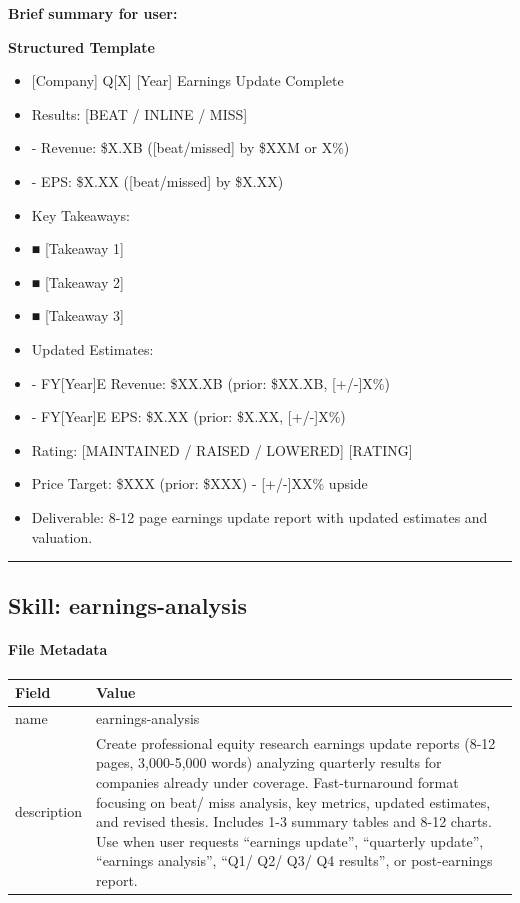 \documentclass[11pt]{article}
\begin{document}
\textbf{Brief summary for user:}

\textbf{Structured Template}
\begin{itemize}[leftmargin=*,itemsep=2pt,topsep=2pt]
\item {} [Company] Q[X] [Year] Earnings Update Complete
\item {} Results: [BEAT / INLINE / MISS]
\item {} - Revenue: \$X.XB ([beat/missed] by \$XXM or X\%)
\item {} - EPS: \$X.XX ([beat/missed] by \$X.XX)
\item {} Key Takeaways:
\item {} ■ [Takeaway 1]
\item {} ■ [Takeaway 2]
\item {} ■ [Takeaway 3]
\item {} Updated Estimates:
\item {} - FY[Year]E Revenue: \$XX.XB (prior: \$XX.XB, [+/-]X\%)
\item {} - FY[Year]E EPS: \$X.XX (prior: \$X.XX, [+/-]X\%)
\item {} Rating: [MAINTAINED / RAISED / LOWERED] [RATING]
\item {} Price Target: \$XXX (prior: \$XXX) - [+/-]XX\% upside
\item {} Deliverable: 8-12 page earnings update report with updated estimates and valuation.
\end{itemize}

\vspace{0.8em}\hrule\vspace{0.8em}

\subsection{Skill: earnings-analysis}\label{file:skills-earnings-analysis-SKILL-md}

\paragraph{File Metadata}\mbox{}\par
\begingroup
\small
\setlength{\tabcolsep}{2pt}
\begin{longtable}{>{\RaggedRight\arraybackslash\hspace{0pt}}p{}>{\RaggedRight\arraybackslash\hspace{0pt}}p{}}
\toprule
{} \textbf{Field} & \textbf{Value} \\
\midrule
{} name & earnings-analysis \\
{} description & Create professional equity research earnings update reports (8-12 pages, 3,000-5,000 words) analyzing quarterly results for companies already under coverage. Fast-turnaround format focusing on beat/ miss analysis, key metrics, updated estimates, and revised thesis. Includes 1-3 summary tables and 8-12 charts. Use when user requests ``earnings update'', ``quarterly update'', ``earnings analysis'', ``Q1/ Q2/ Q3/ Q4 results'', or post-earnings report. \\
\bottomrule
\end{longtable}
\endgroup
\end{document}
